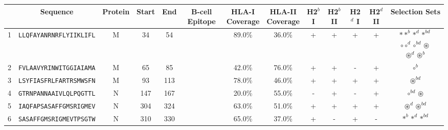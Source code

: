 \begin{tabular}{rcccccccccccc}
\toprule
{} &                        Sequence & Protein &  Start &   End & B-cell Epitope & \Centerstack{HLA-I \\ Coverage} & \Centerstack{HLA-II \\ Coverage} & H2$^{b}$ I & H2$^{b}$ II & H2$^{d}$ I & H2$^{d}$ II &                                                                                                                Selection Sets \\
\midrule
1  &  \texttt{LLQFAYANRNRFLYIIKLIFL} &       M &     34 &    54 &                &                          89.0\% &                           36.0\% &          + &           + &          + &           + &  \Centerstack{  $\ast \ast^b \ast^d \ast^{bd}$ \\  $\circ \circ^d \circ^{bd} \circledast$ \\  $\circledast^d \circledast^b$ } \\
2  &  \texttt{FVLAAVYRINWITGGIAIAMA} &       M &     65 &    85 &                &                          42.0\% &                           76.0\% &          + &           + &          - &           + &                                                                                                                   $ \circ^b $ \\
3  &  \texttt{LSYFIASFRLFARTRSMWSFN} &       M &     93 &   113 &                &                          78.0\% &                           46.0\% &          + &           + &          + &           + &                                                                                                          $ \circledast^{bd} $ \\
4  &  \texttt{GTRNPANNAAIVLQLPQGTTL} &       N &    147 &   167 &                &                          20.0\% &                           55.0\% &          - &           + &          - &           + &                                                                                                    $ \circ^{bd} \circledast $ \\
5  &  \texttt{IAQFAPSASAFFGMSRIGMEV} &       N &    304 &   324 &                &                          63.0\% &                           51.0\% &          + &           + &          + &           + &                                                                                            $ \circledast^d \circledast^{bd} $ \\
6  &  \texttt{SASAFFGMSRIGMEVTPSGTW} &       N &    310 &   330 &                &                          65.0\% &                           37.0\% &          + &           - &          + &           - &                                                                                                   $ \ast^b \ast^d \ast^{bd} $ \\

\end{tabular}
